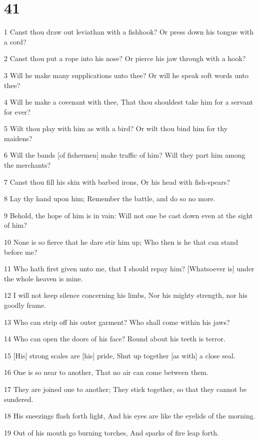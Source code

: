 \chapter{41}

\par 1 Canst thou draw out leviathan with a fishhook? Or press down his tongue with a cord?
\par 2 Canst thou put a rope into his nose? Or pierce his jaw through with a hook?
\par 3 Will he make many supplications unto thee? Or will he speak soft words unto thee?
\par 4 Will he make a covenant with thee, That thou shouldest take him for a servant for ever?
\par 5 Wilt thou play with him as with a bird? Or wilt thou bind him for thy maidens?
\par 6 Will the bands [of fishermen] make traffic of him? Will they part him among the merchants?
\par 7 Canst thou fill his skin with barbed irons, Or his head with fish-spears?
\par 8 Lay thy hand upon him; Remember the battle, and do so no more.
\par 9 Behold, the hope of him is in vain: Will not one be cast down even at the sight of him?
\par 10 None is so fierce that he dare stir him up; Who then is he that can stand before me?
\par 11 Who hath first given unto me, that I should repay him? [Whatsoever is] under the whole heaven is mine.
\par 12 I will not keep silence concerning his limbs, Nor his mighty strength, nor his goodly frame.
\par 13 Who can strip off his outer garment? Who shall come within his jaws?
\par 14 Who can open the doors of his face? Round about his teeth is terror.
\par 15 [His] strong scales are [his] pride, Shut up together [as with] a close seal.
\par 16 One is so near to another, That no air can come between them.
\par 17 They are joined one to another; They stick together, so that they cannot be sundered.
\par 18 His sneezings flash forth light, And his eyes are like the eyelids of the morning.
\par 19 Out of his mouth go burning torches, And sparks of fire leap forth.
